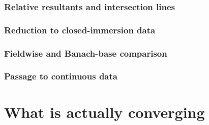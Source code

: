 \subsubsection{Relative resultants and intersection lines}
\label{sec:hybrid-relative-resultants}





\subsubsection{Reduction to closed-immersion data}
\label{sec:hybrid-closed-immersion}



\subsubsection{Fieldwise and Banach-base comparison}
\label{sec:hybrid-fieldwise-comparison}



\subsubsection{Passage to continuous data}
\label{sec:hybrid-continuous-data}



\setcounter{equation}{\savedPseventeenEquation}
\endgroup

\section{What is actually converging}
\label{sec:hybrid-what-converges}

